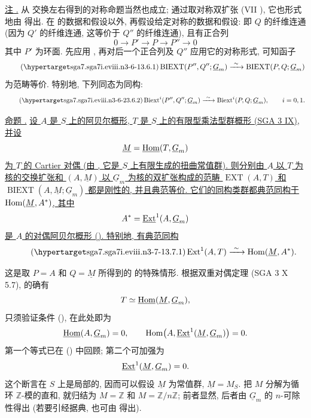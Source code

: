 \medskip
\noindent\underline{注 .} 从  交换左右得到的对称命题当然也成立; 通过取对称双扩张 (VII ), 它也形式地由  得出. 在  的数据和假设以外, 再假设给定对称的数据和假设: 即 $Q$ 的纤维连通 (因为 $Q'$ 的纤维连通, 这等价于 $Q''$ 的纤维连通), 且有正合列
\[
 0\longrightarrow P'\longrightarrow P\longrightarrow P''
 \longrightarrow0
\]
其中 $P'$ 为环面. 先应用 , 再对后一个正合列及 $Q''$ 应用它的对称形式, 可知函子
\begin{equation}\tag{\SGARefTarget{sga7.sga7i.eviii.n3-6-1}{3.6.1}}
 \operatorname{BIEXT}(P'',Q'';\underline G_m)
 \xrightarrow{\ \sim\ }
 \operatorname{BIEXT}(P,Q;\underline G_m)
\end{equation}
为范畴等价. 特别地, 下列同态为同构:
\begin{equation}\tag{\SGARefTarget{sga7.sga7i.eviii.n3-6-2}{3.6.2}}
 \Biext^i(P'',Q'';\underline G_m)
 \xrightarrow{\ \sim\ }
 \Biext^i(P,Q;\underline G_m),
 \qquad i=0,1.
\end{equation}

\medskip
\noindent\underline{命题 .} \underline{设 $A$ 是 $S$ 上的阿贝尔概形, $T$ 是 $S$ 上的有限型乘法型群概形 (SGA 3 IX), 并设}
\[
 \underline M=\uHom(T,\underline G_m)
\]
\underline{为 $T$ 的 Cartier 对偶 (由 , 它是 $S$ 上有限生成的扭曲常值群). 则分别由 $A$ 以 $T$ 为核的交换扩张和 $(A,\underline M)$ 以 $\underline G_m$ 为核的双扩张构成的范畴 $\operatorname{EXT}(A,T)$ 和 $\operatorname{BIEXT}(A,\underline M;\underline G_m)$ 都是刚性的, 并且典范等价. 它们的同构类群都典范同构于 $\Hom(\underline M,A^*)$, 其中}
\[
 A^*=\uExt^1(A,\underline G_m)
\]
\underline{是 $A$ 的对偶阿贝尔概形 (). 特别地, 有典范同构}
\begin{equation}\tag{\SGARefTarget{sga7.sga7i.eviii.n3-7-1}{3.7.1}}
 \Ext^1(A,T)\xrightarrow{\ \sim\ }
 \Hom(\underline M,A^*).
\end{equation}

这是取 $P=A$ 和 $Q=\underline M$ 所得到的  的特殊情形. 根据双重对偶定理 (SGA 3 X 5.7), 的确有
\[
 T\simeq\uHom(\underline M,\underline G_m),
\]
只须验证条件 (), 在此处即为
\[
 \uHom(A,\underline G_m)=0,
 \qquad
 \Hom\bigl(A,\uExt^1(\underline M,\underline G_m)\bigr)=0.
\]
第一个等式已在 () 中回顾; 第二个可加强为
\[
 \uExt^1(\underline M,\underline G_m)=0.
\]
这个断言在 $S$ 上是局部的, 因而可以假设 $\underline
M$ 为常值群, $\underline M=M_S$. 把 $M$ 分解为循环 $\mathbb Z$-模的直和, 就归结为 $M=\mathbb Z$ 和 $M=\mathbb Z/n\mathbb Z$; 前者显然, 后者由 $\underline G_m$ 的 $n$-可除性得出 (若要引经据典, 也可由  得出).

